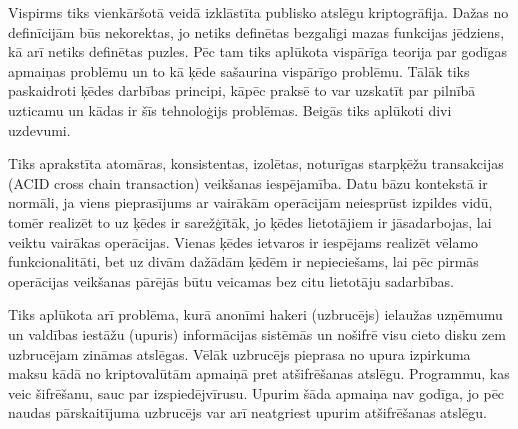 Vispirms tiks vienkāršotā veidā izklāstīta publisko atslēgu kriptogrāfija. Dažas no definīcijām būs nekorektas, jo netiks definētas bezgalīgi mazas funkcijas jēdziens, kā arī netiks definētas puzles. Pēc tam tiks aplūkota vispārīga teorija par godīgas apmaiņas problēmu un to kā ķēde sašaurina vispārīgo problēmu. Tālāk tiks paskaidroti ķēdes darbības principi, kāpēc praksē to var uzskatīt par pilnībā uzticamu un kādas ir šīs tehnoloģijs problēmas. Beigās tiks aplūkoti divi uzdevumi.

Tiks aprakstīta atomāras, konsistentas, izolētas, noturīgas starpķēžu transakcijas (ACID cross chain transaction) veikšanas iespējamība.\cite{back14,nolan13} Datu bāzu kontekstā ir normāli, ja viens pieprasījums ar vairākām operācijām neiesprūst izpildes vidū, tomēr realizēt to uz ķēdes ir sarežģītāk, jo ķēdes lietotājiem ir jāsadarbojas, lai veiktu vairākas operācijas. Vienas ķēdes ietvaros ir iespējams realizēt vēlamo funkcionalitāti, bet uz divām dažādām ķēdēm ir nepieciešams, lai pēc pirmās operācijas veikšanas pārējās būtu veicamas bez citu lietotāju sadarbības.

Tiks aplūkota arī problēma, kurā anonīmi hakeri (uzbrucējs) ielaužas uzņēmumu un valdības iestāžu (upuris) informācijas sistēmās un nošifrē visu cieto disku zem uzbrucējam zināmas atslēgas. 
Vēlāk uzbrucējs pieprasa no upura izpirkuma maksu kādā no kriptovalūtām apmaiņā pret atšifrēšanas atslēgu. Programmu, kas veic šifrēšanu, sauc par izspiedējvīrusu.
Upurim šāda apmaiņa nav godīga, jo pēc naudas pārskaitījuma uzbrucējs var arī neatgriest upurim atšifrēšanas atslēgu. %

